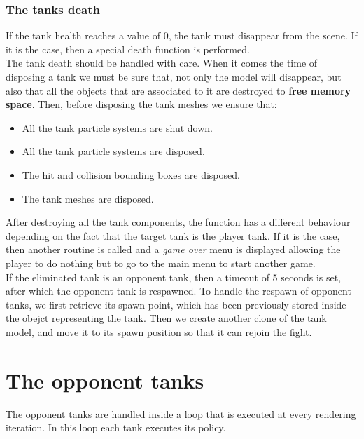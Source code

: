 \documentclass[14pt]{article}
\begin{document}
\subsubsection{The tanks death}
If the tank health reaches a value of 0, the tank must disappear from the scene. If it is the case, then a special death function is performed. \\
The tank death should be handled with care. When it comes the time of disposing a tank we must be sure that, not only the model will disappear, but also that all the objects that are associated to it are destroyed to \textbf{free memory space}. Then, before disposing the tank meshes we ensure that:
\begin{itemize}
\item All the tank particle systems are shut down.
\item All the tank particle systems are disposed.
\item The hit and collision bounding boxes are disposed.
\item The tank meshes are disposed.
\end{itemize}
After destroying all the tank components, the function has a different behaviour depending on the fact that the target tank is the player tank. If it is the case, then another routine is called and a \textit{game over} menu is displayed allowing the player to do nothing but to go to the main menu to start another game.\\
If the eliminated tank is an opponent tank, then a timeout of 5 seconds is set, after which the opponent tank is respawned. To handle the respawn of opponent tanks, we first retrieve its spawn point, which has been previously stored inside the obejct representing the tank. Then we create another clone of the tank model, and move it to its spawn position so that it can rejoin the fight.

\section{The opponent tanks}
The opponent tanks are handled inside a loop that is executed at every rendering iteration. In this loop each tank executes its policy.
\end{document}
